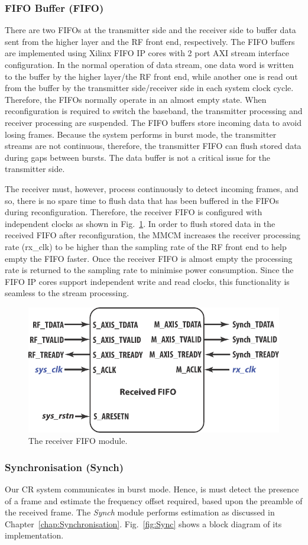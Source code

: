 \subsubsection{FIFO Buffer (FIFO)}
There are two FIFOs at the transmitter side and the receiver side to buffer data sent from the higher layer and the RF front end, respectively.
The FIFO buffers are implemented using Xilinx FIFO IP cores with 2 port AXI stream interface configuration.
In the normal operation of data stream, one data word is written to the buffer by the higher layer/the RF front end, while another one is read out from the buffer by the transmitter side/receiver side in each system clock cycle.
Therefore, the FIFOs normally operate in an almost empty state.
When reconfiguration is required to switch the baseband, the transmitter processing and receiver processing are suspended.
The FIFO buffers store incoming data to avoid losing frames.
Because the system performs in burst mode, the transmitter streams are not continuous, therefore, the transmitter FIFO can flush stored data during  gaps between bursts.
The data buffer is not a critical issue for the transmitter side.

The receiver must, however, process continuously to detect incoming frames, and so, there is no spare time to flush data that has been buffered in the FIFOs during reconfiguration.
Therefore, the receiver FIFO is configured with independent clocks as shown in Fig.~\ref{fig:FIFO}.
In order to flush stored data in the received FIFO after reconfiguration, the MMCM increases the receiver processing rate (rx\_clk) to be higher than the sampling rate of the RF front end to help empty the FIFO faster.
Once the receiver FIFO is almost empty the processing rate is returned to the sampling rate to minimise power consumption.
Since the FIFO IP cores support independent write and read clocks, this functionality is seamless to the stream processing.
\begin{figure}
\centering
\includegraphics [width=0.5\columnwidth]{Figures/MSCR_RX_FIFO.pdf}
\caption{The receiver FIFO module.}
\label{fig:FIFO}
\end{figure}

\subsubsection{Synchronisation (Synch)}
Our CR system communicates in burst mode.
Hence, is must detect the presence of a frame and estimate the frequency offset required, based upon the preamble of the received frame.
The \emph{Synch} module performs estimation as discussed in Chapter~\ref{chap:Synchronisation}.
Fig.~\ref{fig:Sync} shows a block diagram of its implementation.

